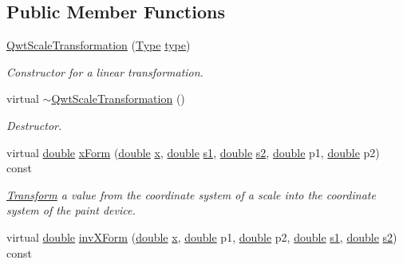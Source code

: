 \subsection*{Public Member Functions}
\begin{DoxyCompactItemize}
\item 
\hyperlink{class_qwt_scale_transformation_ab1e8473584fe5146322fd4a745727a5f}{Qwt\-Scale\-Transformation} (\hyperlink{class_qwt_scale_transformation_a5b4e85a0640906586b3180872aaeb786}{Type} \hyperlink{glext_8h_a7d05960f4f1c1b11f3177dc963a45d86}{type})
\begin{DoxyCompactList}\small\item\em Constructor for a linear transformation. \end{DoxyCompactList}\item 
virtual \hyperlink{class_qwt_scale_transformation_a2eccd8e538af9a3105f61f9f20a0ad8b}{$\sim$\-Qwt\-Scale\-Transformation} ()
\begin{DoxyCompactList}\small\item\em Destructor. \end{DoxyCompactList}\item 
virtual \hyperlink{_super_l_u_support_8h_a8956b2b9f49bf918deed98379d159ca7}{double} \hyperlink{class_qwt_scale_transformation_a54768a41cd5d7867e74c0d0032e45ec2}{x\-Form} (\hyperlink{_super_l_u_support_8h_a8956b2b9f49bf918deed98379d159ca7}{double} \hyperlink{glext_8h_a1db9d104e3c2128177f26aff7b46982f}{x}, \hyperlink{_super_l_u_support_8h_a8956b2b9f49bf918deed98379d159ca7}{double} \hyperlink{_o_p_plots_8m_a2f07e0f444810cc4e54ee2be2ce0ac65}{s1}, \hyperlink{_super_l_u_support_8h_a8956b2b9f49bf918deed98379d159ca7}{double} \hyperlink{_o_p_plots_8m_a2e63e71737e8b6802b81f6a7c5ca6a0a}{s2}, \hyperlink{_super_l_u_support_8h_a8956b2b9f49bf918deed98379d159ca7}{double} p1, \hyperlink{_super_l_u_support_8h_a8956b2b9f49bf918deed98379d159ca7}{double} p2) const 
\begin{DoxyCompactList}\small\item\em \hyperlink{class_transform}{Transform} a value from the coordinate system of a scale into the coordinate system of the paint device. \end{DoxyCompactList}\item 
virtual \hyperlink{_super_l_u_support_8h_a8956b2b9f49bf918deed98379d159ca7}{double} \hyperlink{class_qwt_scale_transformation_a366820cc9adb6678b2b613b8a7bc5fc7}{inv\-X\-Form} (\hyperlink{_super_l_u_support_8h_a8956b2b9f49bf918deed98379d159ca7}{double} \hyperlink{glext_8h_a1db9d104e3c2128177f26aff7b46982f}{x}, \hyperlink{_super_l_u_support_8h_a8956b2b9f49bf918deed98379d159ca7}{double} p1, \hyperlink{_super_l_u_support_8h_a8956b2b9f49bf918deed98379d159ca7}{double} p2, \hyperlink{_super_l_u_support_8h_a8956b2b9f49bf918deed98379d159ca7}{double} \hyperlink{_o_p_plots_8m_a2f07e0f444810cc4e54ee2be2ce0ac65}{s1}, \hyperlink{_super_l_u_support_8h_a8956b2b9f49bf918deed98379d159ca7}{double} \hyperlink{_o_p_plots_8m_a2e63e71737e8b6802b81f6a7c5ca6a0a}{s2}) const 

\end{DoxyCompactItemize}
